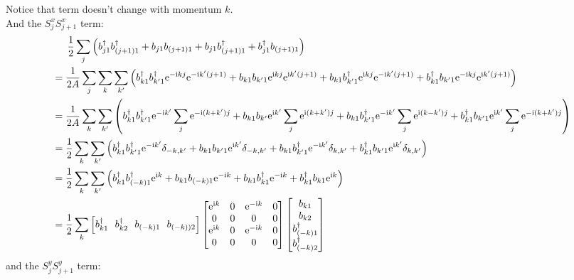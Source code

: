 \documentclass[letter]{article}
\newcommand{\e}{\mathrm{e}}
\newcommand{\ii}{\mathrm{i}}
\begin{document}
Notice that term doesn't change with momentum $k$.\\
And the $S_j^x S_{j+1}^x$ term:
$$\begin{aligned}
    & \indent  \frac{1}{2}\sum_{j}\left(b_{j1}^{\dagger}b_{(j+1)1}^{\dagger}+b_{j1}b_{(j+1)1}+b_{j1}b_{(j+1)1}^{\dagger}+b_{j1}^{\dagger}b_{(j+1)1}\right)\\
    &=\frac{1}{2A}\sum_{j}\sum_{k}\sum_{k'}\left(b_{k1}^{\dagger}b_{k'1}^{\dagger}\e^{-\ii kj}\e^{-\ii k'(j+1)}+b_{k1}b_{k'1}\e^{\ii kj}\e^{\ii k'(j+1)}+b_{k1}b_{k'1}^{\dagger}\e^{\ii kj}\e^{-\ii k'(j+1)}+b_{k1}^{\dagger}b_{k'1}\e^{-\ii kj}\e^{\ii k'(j+1)}\right)\\
    &=\frac{1}{2A}\sum_{k}\sum_{k'}\left(b_{k1}^{\dagger}b_{k'1}^{\dagger}\e^{-\ii k'}\sum_j \e^{-\ii (k+k')j}+b_{k1}b_{k'}\e^{\ii k'}\sum_j \e^{\ii (k+k')j}+b_{k1}b_{k'1}^{\dagger}\e^{-\ii k'}\sum_j \e^{\ii (k-k')j}+b_{k1}^{\dagger}b_{k'1}\e^{\ii k'}\sum_j \e^{-\ii (k+k')j}\right)\\
    &=\frac{1}{2}\sum_k\sum_{k'}\left(b_{k1}^{\dagger}b_{k'1}^{\dagger}\e^{-\ii k'}\delta_{-k,k'}+b_{k1}b_{k'1}\e^{\ii k'}\delta_{-k,k'}+b_{k1}b_{k'1}^{\dagger}\e^{-\ii k'}\delta_{k,k'}+b_{k1}^{\dagger}b_{k'1}\e^{\ii k'}\delta_{k,k'}\right)\\
    &=\frac{1}{2}\sum_k\sum_{k'}\left(b_{k1}^{\dagger}b_{(-k)1}^{\dagger}\e^{\ii k}+b_{k1}b_{(-k)1}\e^{-\ii k}+b_{k1}b_{k1}^{\dagger}\e^{-\ii k}+b_{k1}^{\dagger}b_{k1}\e^{\ii k}\right)\\
    &=\frac{1}{2}\sum_k \left[
      b_{k1}^{\dagger} \ \ 
      b_{k2}^{\dagger}\  \ 
      b_{(-k)1}\ \ 
      b_{(-k))2}\right]
     \begin{bmatrix}
          \e^{\ii k} & 0 & \e^{-\ii k} & 0 \\
         0 &  0 & 0 &0 \\
         \e^{\ii k} &  0 & \e^{-\ii k} &0\\
          0 & 0 & 0& 0
          \end{bmatrix}\begin{bmatrix}
              b_{k1}  \\
              b_{k2}  \\
              b_{(-k)1}^{\dagger}\\
              b_{(-k)2}^{\dagger}
              \end{bmatrix}
  \end{aligned}
  $$
  and the $S_j^y S_{j+1}^y$ term:
\end{document}
